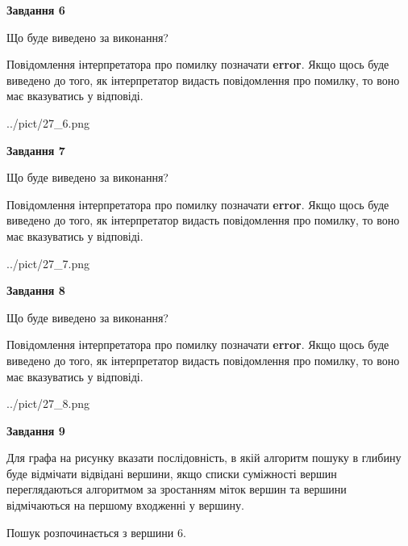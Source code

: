 \documentclass[12pt, ukrainian]{article}
\begin{document}
{\begin {large}
{\begin {center}\textbf{Завдання 6}\end {center}}\par
Що буде виведено за виконання?

Повідомлення інтерпретатора про помилку позначати \textbf{error}.
Якщо щось буде виведено до того, як інтерпретатор видасть повідомлення про помилку, 
то воно має вказуватись у відповіді. \par


\begin{center}
	{../pict/27_6.png}
\end{center}
\newpage

{\begin {center}\textbf{Завдання 7}\end {center}}\par
Що буде виведено за виконання?

Повідомлення інтерпретатора про помилку позначати \textbf{error}.
Якщо щось буде виведено до того, як інтерпретатор видасть повідомлення про помилку, 
то воно має вказуватись у відповіді. \par


\begin{center}
	{../pict/27_7.png}
\end{center}
\newpage

{\begin {center}\textbf{Завдання 8}\end {center}}\par
Що буде виведено за виконання?

Повідомлення інтерпретатора про помилку позначати \textbf{error}.
Якщо щось буде виведено до того, як інтерпретатор видасть повідомлення про помилку, 
то воно має вказуватись у відповіді. \par


\begin{center}
	{../pict/27_8.png}
\end{center}
\newpage

{\begin {center}\textbf{Завдання 9}\end {center}}\par
Для графа на рисунку вказати послідовність, в якій алгоритм пошуку в глибину буде відмічати відвідані вершини, якщо списки суміжності вершин переглядаються алгоритмом за зростанням міток вершин та вершини відмічаються на першому вход\-женні у вершину.\par
Пошук розпочинається з вершини 6.\par


\end{large}}
\end{document}
